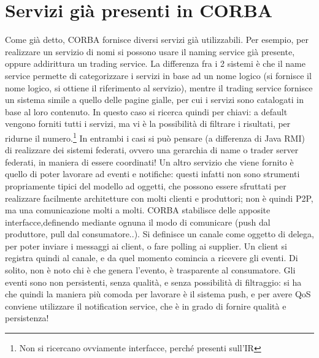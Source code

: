 \section{Servizi già presenti in CORBA}
Come già detto, CORBA fornisce diversi servizi già utilizzabili.
Per esempio, per realizzare un servizio di nomi si possono usare il naming service già presente, oppure addirittura un
trading service. La differenza fra i 2 sistemi è che il name service permette di categorizzare i servizi in base ad
un nome logico (si fornisce il nome logico, si ottiene il riferimento al servizio), mentre il trading service fornisce
un sistema simile a quello delle pagine gialle, per cui i servizi sono catalogati in base al loro contenuto. In questo
caso si ricerca quindi per chiavi: a default vengono forniti tutti i servizi, ma vi è la possibilità di filtrare i
risultati, per ridurne il numero.\footnote{Non si ricercano ovviamente interfacce, perché presenti sull'IR}
In entrambi i casi si può pensare (a differenza di Java RMI) di realizzare dei sistemi federati, ovvero una gerarchia di
name o trader server federati, in maniera di essere coordinati!
Un altro servizio che viene fornito è quello di poter lavorare ad eventi e notifiche: questi infatti non sono strumenti
propriamente tipici del modello ad oggetti, che possono essere sfruttati per realizzare facilmente architetture con
molti clienti e produttori; non è quindi P2P, ma una comunicazione molti a molti.
CORBA stabilisce delle apposite interfacce,definendo mediante ognuna il modo di comunicare (push dal produttore, pull dal
consumatore..). Si definisce un canale come oggetto di delega, per poter inviare i messaggi ai client, o fare polling ai
supplier. Un client si registra quindi al canale, e da quel momento comincia a ricevere gli eventi.
Di solito, non è noto chi è che genera l'evento, è trasparente al consumatore.
Gli eventi sono non persistenti, senza qualità, e senza possibilità di filtraggio: si ha che quindi la maniera più
comoda per lavorare è il sistema push, e per avere QoS conviene utilizzare il notification service, che è in grado di
fornire qualità e persistenza!
